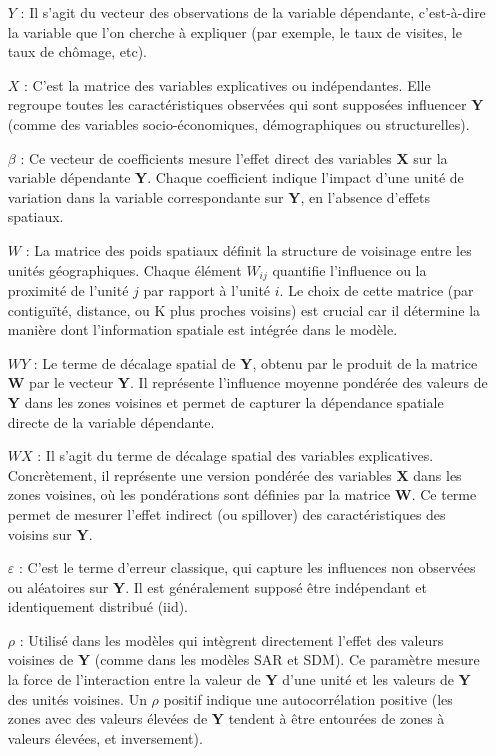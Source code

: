 \documentclass[
]{article}
\begin{document}
\begin{itemize}
\item[\(Y\)] : Il s'agit du vecteur des observations de la variable dépendante, c'est-à-dire la variable que l'on cherche à expliquer (par exemple, le taux de visites, le taux de chômage, etc).
\item[\(X\)] : C'est la matrice des variables explicatives ou indépendantes. Elle regroupe toutes les caractéristiques observées qui sont supposées influencer \textbf{Y} (comme des variables socio-économiques, démographiques ou structurelles).
\item[\(\beta\)] : Ce vecteur de coefficients mesure l'effet direct des variables \textbf{X} sur la variable dépendante \textbf{Y}. Chaque coefficient indique l'impact d'une unité de variation dans la variable correspondante sur \textbf{Y}, en l'absence d'effets spatiaux.
\item[\(W\)] : La matrice des poids spatiaux définit la structure de voisinage entre les unités géographiques. Chaque élément \(W_{ij}\) quantifie l'influence ou la proximité de l'unité \(j\) par rapport à l'unité \(i\). Le choix de cette matrice (par contiguïté, distance, ou K plus proches voisins) est crucial car il détermine la manière dont l'information spatiale est intégrée dans le modèle.
\item[\(WY\)] : Le terme de décalage spatial de \textbf{Y}, obtenu par le produit de la matrice \textbf{W} par le vecteur \textbf{Y}. Il représente l'influence moyenne pondérée des valeurs de \textbf{Y} dans les zones voisines et permet de capturer la dépendance spatiale directe de la variable dépendante.
\item[\(WX\)] : Il s'agit du terme de décalage spatial des variables explicatives. Concrètement, il représente une version pondérée des variables \textbf{X} dans les zones voisines, où les pondérations sont définies par la matrice \textbf{W}. Ce terme permet de mesurer l'effet indirect (ou spillover) des caractéristiques des voisins sur \textbf{Y}.
\item[\(\varepsilon\)] : C'est le terme d'erreur classique, qui capture les influences non observées ou aléatoires sur \textbf{Y}. Il est généralement supposé être indépendant et identiquement distribué (iid).
\item[\(\rho\)] : Utilisé dans les modèles qui intègrent directement l'effet des valeurs voisines de \textbf{Y} (comme dans les modèles SAR et SDM). Ce paramètre mesure la force de l'interaction entre la valeur de \textbf{Y} d'une unité et les valeurs de \textbf{Y} des unités voisines. Un \(\rho\) positif indique une autocorrélation positive (les zones avec des valeurs élevées de \textbf{Y} tendent à être entourées de zones à valeurs élevées, et inversement).

\end{itemize}
\end{document}
